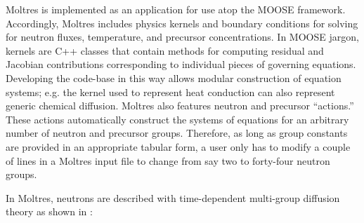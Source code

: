 \documentclass{article}
\begin{document}
Moltres \cite{lindsay_moltres_2017} is implemented as an application for
use atop the \gls{MOOSE} \cite{gaston_physics-based_2015} framework.
Accordingly, Moltres includes physics kernels and boundary conditions for
solving for neutron fluxes, temperature, and precursor concentrations. In \gls{MOOSE}
jargon, kernels are C++ classes that contain methods for computing residual and
Jacobian contributions corresponding to individual pieces of governing
equations. Developing the code-base in this way allows modular construction
of equation systems; e.g. the kernel used to represent heat
conduction can also represent generic chemical diffusion. Moltres
also features neutron and precursor ``actions.'' These actions automatically
construct the systems of equations for an arbitrary number of neutron and
precursor groups. Therefore, as long as group constants are provided in an appropriate
tabular form, a user only has to modify a couple of lines in a Moltres input
file to change from say two to forty-four neutron groups.

In Moltres, neutrons are described with time-dependent multi-group diffusion theory as shown
in :
\end{document}
